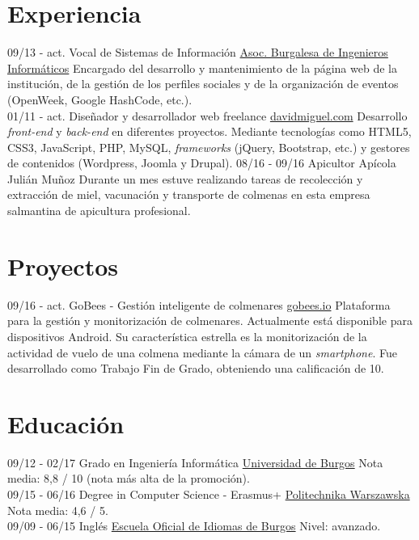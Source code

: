 \documentclass[]{friggeri-cv}
\begin{document}
\section{Experiencia}
\begin{entrylist}
    \entry
    {09/13 - act.}
    {Vocal de Sistemas de Información}
    {\href{http://abi2burgos.es/}{Asoc. Burgalesa de Ingenieros Informáticos}}
    {Encargado del desarrollo y mantenimiento de la página web de la institución, de la gestión de los perfiles sociales y de la organización de eventos (OpenWeek, Google HashCode, etc.).\\}
    \entry
    {01/11 - act.}
    {Diseñador y desarrollador web freelance}
    {\href{http://davidmiguel.com/}{davidmiguel.com}}
    {Desarrollo \textit{front-end} y \textit{back-end} en diferentes proyectos. Mediante tecnologías como HTML5, CSS3, JavaScript, PHP, MySQL, \textit{frameworks} (jQuery, Bootstrap, etc.) y gestores de contenidos (Wordpress, Joomla y Drupal).
    }
    \entry
    {08/16 - 09/16}
    {Apicultor}
    {Apícola Julián Muñoz}
    {Durante un mes estuve realizando tareas de recolección y extracción de miel, vacunación y transporte de colmenas en esta empresa salmantina de apicultura profesional.\\}
\end{entrylist}

\section{Proyectos}
\begin{entrylist}
  \entry
    {09/16 - act.}
    {GoBees - Gestión inteligente de colmenares}
    {\href{http://gobees.io/}{gobees.io}}
    {Plataforma para la gestión y monitorización de colmenares. Actualmente está disponible para dispositivos Android. Su característica estrella es la monitorización de la actividad de vuelo de una colmena mediante la cámara de un \emph{smartphone}. Fue desarrollado como Trabajo Fin de Grado, obteniendo una calificación de 10.}
\end{entrylist}

\section{Educación}
\begin{entrylist}
  \entry
    {09/12 - 02/17}
    {Grado en Ingeniería Informática}
    {\href{http://wwww.ubu.es/}{Universidad de Burgos}}
    {Nota media: 8,8 / 10 (nota más alta de la promoción).\\}
  \entry
    {09/15 - 06/16}
    {Degree in Computer Science - Erasmus+}
    {\href{https://www.pw.edu.pl/}{Politechnika Warszawska}}
    {Nota media: 4,6 / 5.\\}
  \entry
    {09/09 - 06/15}
    {Inglés}
    {\href{http://eoiburgos.centros.educa.jcyl.es/}{Escuela Oficial de Idiomas de Burgos}}
    {Nivel: avanzado.\\}
\end{entrylist}
\end{document}
